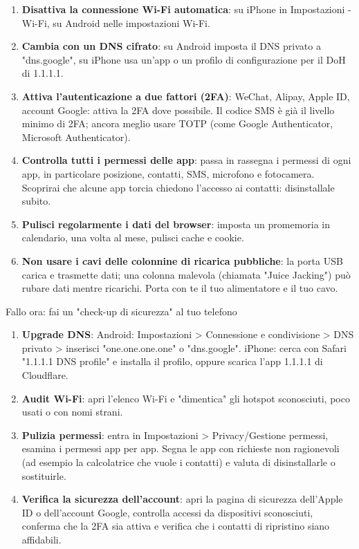 \begin{enumerate}
  \item \textbf{Disattiva la connessione Wi-Fi automatica}: su iPhone in Impostazioni - Wi-Fi, su Android nelle impostazioni Wi-Fi.
  \item \textbf{Cambia con un DNS cifrato}: su Android imposta il DNS privato a "dns.google", su iPhone usa un'app o un profilo di configurazione per il DoH di 1.1.1.1.
  \item \textbf{Attiva l'autenticazione a due fattori (2FA)}: WeChat, Alipay, Apple ID, account Google: attiva la 2FA dove possibile. Il codice SMS è già il livello minimo di 2FA; ancora meglio usare TOTP (come Google Authenticator, Microsoft Authenticator).
  \item \textbf{Controlla tutti i permessi delle app}: passa in rassegna i permessi di ogni app, in particolare posizione, contatti, SMS, microfono e fotocamera. Scoprirai che alcune app torcia chiedono l'accesso ai contatti: disinstallale subito.
  \item \textbf{Pulisci regolarmente i dati del browser}: imposta un promemoria in calendario, una volta al mese, pulisci cache e cookie.
  \item \textbf{Non usare i cavi delle colonnine di ricarica pubbliche}: la porta USB carica e trasmette dati; una colonna malevola (chiamata "Juice Jacking") può rubare dati mentre ricarichi. Porta con te il tuo alimentatore e il tuo cavo.
\end{enumerate}

\begin{tcbpractice}{Fallo ora: fai un "check-up di sicurezza" al tuo telefono}
\begin{enumerate}
  \item \textbf{Upgrade DNS}: Android: Impostazioni > Connessione e condivisione > DNS privato > inserisci "one.one.one.one" o "dns.google". iPhone: cerca con Safari "1.1.1.1 DNS profile" e installa il profilo, oppure scarica l'app 1.1.1.1 di Cloudflare.
  \item \textbf{Audit Wi-Fi}: apri l'elenco Wi-Fi e "dimentica" gli hotspot sconosciuti, poco usati o con nomi strani.
  \item \textbf{Pulizia permessi}: entra in Impostazioni > Privacy/Gestione permessi, esamina i permessi app per app. Segna le app con richieste non ragionevoli (ad esempio la calcolatrice che vuole i contatti) e valuta di disinstallarle o sostituirle.
  \item \textbf{Verifica la sicurezza dell'account}: apri la pagina di sicurezza dell'Apple ID o dell'account Google, controlla accessi da dispositivi sconosciuti, conferma che la 2FA sia attiva e verifica che i contatti di ripristino siano affidabili.
\end{enumerate}

\end{tcbpractice}
